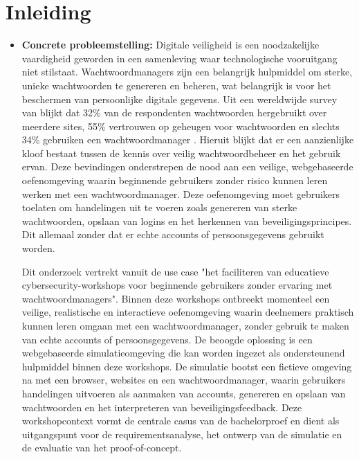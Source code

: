 
\section{Inleiding}%
\label{sec:inleiding}


\begin{itemize}

\item \colorbox{probleemstelling}{\parbox{\dimexpr\linewidth-2\fboxsep}{\textbf{Concrete probleemstelling:} Digitale veiligheid is een noodzakelijke vaardigheid geworden in een samenleving waar technologische vooruitgang niet stilstaat. Wachtwoordmanagers zijn een belangrijk hulpmiddel om sterke, unieke wachtwoorden te genereren en beheren, wat belangrijk is voor het beschermen van persoonlijke digitale gegevens. 
Uit een wereldwijde survey van \textcite{Bitwarden2022} blijkt dat 32\% van de respondenten wachtwoorden hergebruikt over meerdere sites, 55\% vertrouwen op geheugen voor wachtwoorden en slechts 34\% gebruiken een wachtwoordmanager \autocite{Bitwarden2022}. Hieruit blijkt dat er een aanzienlijke kloof bestaat tussen de kennis over veilig wachtwoordbeheer en het gebruik ervan.
Deze bevindingen onderstrepen de nood aan een veilige, webgebaseerde oefenomgeving waarin beginnende gebruikers zonder risico kunnen leren werken met een wachtwoordmanager. Deze oefenomgeving moet gebruikers toelaten om handelingen uit te voeren zoals genereren van sterke wachtwoorden, opslaan van logins en het herkennen van beveiligingsprincipes. Dit allemaal zonder dat er echte accounts of persoonsgegevens gebruikt worden.}}
Dit onderzoek vertrekt vanuit de use case "het faciliteren van educatieve cybersecurity-workshops voor beginnende gebruikers zonder ervaring met wachtwoordmanagers". Binnen deze workshops ontbreekt momenteel een veilige, realistische en interactieve oefenomgeving waarin deelnemers praktisch kunnen leren omgaan met een wachtwoordmanager, zonder gebruik te maken van echte accounts of persoonsgegevens.
De beoogde oplossing is een webgebaseerde simulatieomgeving die kan worden ingezet als ondersteunend hulpmiddel binnen deze workshops. 
De simulatie bootst een fictieve omgeving na met een browser, websites en een wachtwoordmanager, waarin gebruikers handelingen uitvoeren als aanmaken van accounts, genereren en opslaan van wachtwoorden en het interpreteren van beveiligingsfeedback. Deze workshopcontext vormt de centrale casus van de bachelorproef en dient als uitgangspunt voor de requirementsanalyse, het ontwerp van de simulatie en de evaluatie van het proof-of-concept. 

\end{itemize}
